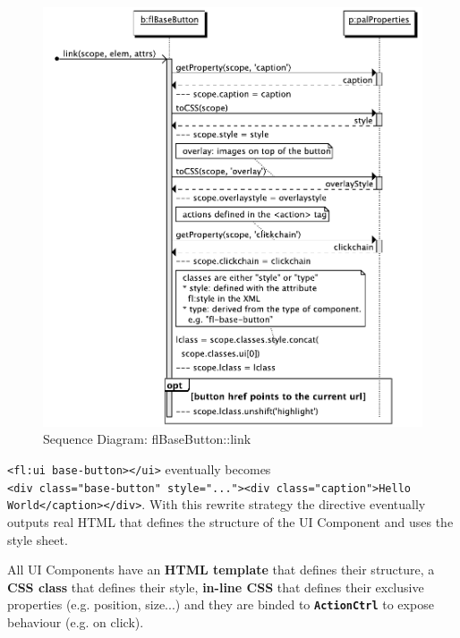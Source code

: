 \begin{figure}[htb]
    \centering
    \includegraphics{figures/design/seqdia/basebutton-link.pdf}
    \caption{Sequence Diagram: flBaseButton::link}
    \label{fig:design-seqdia-basebutton-link}
\end{figure}

\lstinline$<fl:ui base-button></ui>$ eventually becomes \\
\lstinline$<div class="base-button" style="..."><div class="caption">Hello World</caption></div>$. 
With this rewrite strategy the directive eventually outputs real \ac{HTML} that defines the structure of the UI Component and uses the style sheet.

All UI Components have an  \textbf{\ac{HTML} template} that defines their structure, a \textbf{\ac{CSS} class} that defines their style, \textbf{in-line \ac{CSS}} that defines their exclusive properties (e.g. position, size...) and they are binded to \textbf{\texttt{ActionCtrl}} to expose behaviour (e.g. on click).
\FloatBarrier

